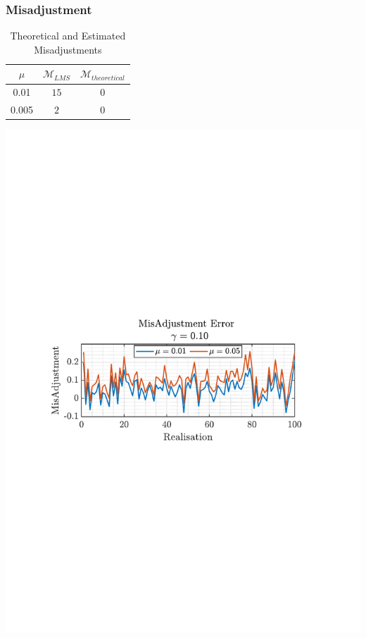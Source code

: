 \documentclass[12pt]{article}
\begin{document}
		\subsubsection{Misadjustment}
			\begin{minipage}[b]{0.49\textwidth}
				\begin{table}[H]
					\centering
					\begin{tabular}{|c|c||c|}
						\hline
						\textbf{$\mu$} & \textbf{$\mathcal{M}_{LMS}$} & \textbf{$\mathcal{M}_{theoretical}$} \\
						\hline
						\hline
						0.01 & $15$ & $0$ \\
						\hline
						0.005 & $2$ & $0$ \\
						\hline
					\end{tabular}
					\captionsetup{justification=centering}
					\caption{Theoretical and Estimated Misadjustments}
					\label{tab: 2-1c}
				\end{table}
			\end{minipage}%
			\begin{minipage}{0.04\textwidth}
				\hspace*{0.04\textwidth}
			\end{minipage}%
			\begin{minipage}{0.49\textwidth}
				\centering
				\includegraphics[trim={2.2cm 11.2cm 3.15cm  11.2cm}, clip, width=\textwidth]{../MATLAB/figures/q2_1f_fig01.pdf} 
				\captionsetup{justification=centering}
				\label{fig: 2-1c}
			\end{minipage}%
\end{document}
